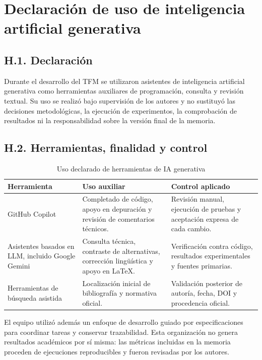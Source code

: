 \chapter{Declaración de uso de inteligencia artificial generativa}
\label{cap:anexoh}

\section*{H.1. Declaración}

Durante el desarrollo del TFM se utilizaron asistentes de inteligencia artificial
generativa como herramientas auxiliares de programación, consulta y revisión textual.
Su uso se realizó bajo supervisión de los autores y no sustituyó las decisiones
metodológicas, la ejecución de experimentos, la comprobación de resultados ni la
responsabilidad sobre la versión final de la memoria.

\section*{H.2. Herramientas, finalidad y control}

\begin{table}[htbp]
\centering
\caption{Uso declarado de herramientas de IA generativa}
\label{tab:anexoh-herramientas}
\small
\begin{tabularx}{\textwidth}{|p{3.1cm}|X|p{4.0cm}|}
\hline
\textbf{Herramienta} & \textbf{Uso auxiliar} & \textbf{Control aplicado} \\ \hline
GitHub Copilot \cite{GitHubCopilot2023} & Completado de código, apoyo en depuración y revisión de comentarios técnicos. & Revisión manual, ejecución de pruebas y aceptación expresa de cada cambio. \\ \hline
Asistentes basados en LLM, incluido Google Gemini \cite{GoogleGemini2026} & Consulta técnica, contraste de alternativas, corrección lingüística y apoyo en LaTeX. & Verificación contra código, resultados experimentales y fuentes primarias. \\ \hline
Herramientas de búsqueda asistida & Localización inicial de bibliografía y normativa oficial. & Validación posterior de autoría, fecha, DOI y procedencia oficial. \\ \hline
\end{tabularx}
\end{table}

El equipo utilizó además un enfoque de desarrollo guiado por especificaciones para
coordinar tareas y conservar trazabilidad. Esta organización no genera resultados
académicos por sí misma: las métricas incluidas en la memoria proceden de ejecuciones
reproducibles y fueron revisadas por los autores.


